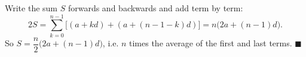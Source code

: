 Write the sum $S$ forwards and backwards and add term by term:
\[2S=\sum_{k=0}^{n-1}\big[(a+kd)+(a+(n-1-k)d)\big]=n\big(2a+(n-1)d\big).\]
So $S=\dfrac n2\big(2a+(n-1)d\big)$, i.e. $n$ times the average of the first and last terms. $\blacksquare$
